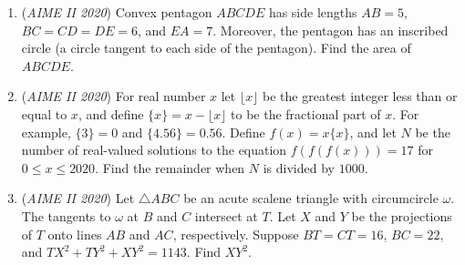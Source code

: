 \begin{enumerate}
 

	\item (\textit{AIME II 2020}) Convex pentagon $ABCDE$ has side lengths $AB=5$, $BC=CD=DE=6$, and $EA=7$. Moreover, the pentagon has an inscribed circle (a circle tangent to each side of the pentagon). Find the area of $ABCDE$.


 

	\item (\textit{AIME II 2020}) For real number $x$ let $\lfloor x\rfloor$ be the greatest integer less than or equal to $x$, and define $\{x\} = x - \lfloor x \rfloor$ to be the fractional part of $x$. For example, $\{3\} = 0$ and $\{4.56\} = 0.56$. Define $f(x)=x\{x\}$, and let $N$ be the number of real-valued solutions to the equation $f(f(f(x)))=17$ for $0\leq x\leq 2020$. Find the remainder when $N$ is divided by $1000$.


 

	\item (\textit{AIME II 2020}) Let $\triangle ABC$ be an acute scalene triangle with circumcircle $\omega$. The tangents to $\omega$ at $B$ and $C$ intersect at $T$. Let $X$ and $Y$ be the projections of $T$ onto lines $AB$ and $AC$, respectively. Suppose $BT = CT = 16$, $BC = 22$, and $TX^2 + TY^2 + XY^2 = 1143$. Find $XY^2$.


 

\end{enumerate}